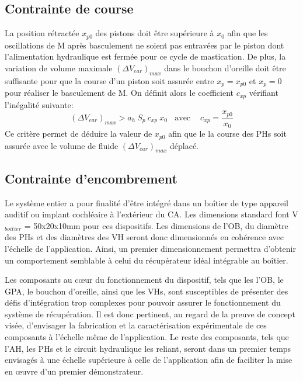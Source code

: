 		\subsection{Contrainte de course}
		\label{subsec:2.5.3_Contrainte de course}	
La position rétractée $x_{p0}$ des pistons doit être supérieure à $x_0$ afin que les oscillations de M après basculement ne soient pas entravées par le piston dont l'alimentation hydraulique est fermée pour ce cycle de mastication. De plus, la variation de volume maximale $(\Delta V_{ear})_{max}$ dans le bouchon d'oreille doit être suffisante pour que la course d'un piston soit assurée entre $x_p = x_{p0}$ et  $x_p =0$ pour réaliser le basculement de M. On définit alors le coefficient $c_{xp}$ vérifiant l'inégalité suivante:
\begin{equation}
(\Delta V_{ear})_{max} > a_h\ S_p\ c_{xp}\ x_0~~~~\text{avec }~~~~c_{xp} = \dfrac{x_{p0}}{x_0}
\label{eq:critere_course}
\end{equation}
Ce critère permet de déduire la valeur de $x_{p0}$ afin que le la course des PHs soit assurée avec le volume de fluide $(\Delta V_{ear})_{max}$ déplacé.
		\subsection{Contrainte d'encombrement}
		\label{subsec:2.5.4_Contrainte d'encombrement}	
Le système entier a pour finalité d'être intégré dans un boîtier de type appareil auditif ou implant cochléaire à l'extérieur du CA. Les dimensions standard font V$_{boitier}$ = 50x20x10mm pour ces dispositifs. Les dimensions de l'OB, du diamètre des PHs et des diamètres des VH seront donc dimensionnés en cohérence avec l'échelle de l'application. Ainsi, un premier dimensionnement permettra d'obtenir un comportement semblable à celui du récupérateur idéal intégrable au boîtier. 

Les composants au c\oe{}ur du fonctionnement du dispositif, tels que les l'OB, le GPA, le bouchon d'oreille, ainsi que les VHs, sont susceptibles de présenter des défis d'intégration trop complexes pour pouvoir assurer le fonctionnement du système de récupération. Il est donc pertinent, au regard de la preuve de concept visée, d'envisager la fabrication et la caractérisation expérimentale de ces composants à l'échelle même de l'application. Le reste des composants, tels que l'AH, les PHs et le circuit hydraulique les reliant, seront dans un premier temps envisagés à une échelle supérieure à celle de l'application afin de faciliter la mise en \oe{}uvre d'un premier démonstrateur. 

